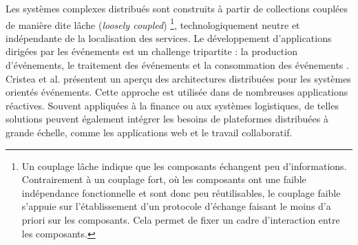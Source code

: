 Les systèmes complexes distribués sont construits à partir de collections 
couplées de manière dite \og lâche\fg{} (\textit{loosely coupled}) \footnote{Un 
couplage lâche indique que les composants échangent peu d'informations. 
Contrairement à un couplage fort, où les composants ont une faible indépendance 
fonctionnelle et sont donc peu réutilisables, le couplage faible s'appuie 
sur l'établissement d'un protocole d'échange faisant le moins d'a priori sur les 
composants. Cela permet de fixer un cadre d'interaction entre les composants.}, 
technologiquement neutre et indépendante de la localisation des services. 
Le développement d'applications dirigées par les événements est un challenge 
tripartite : la production d'événements, le traitement des événements et la 
consommation des événements \cite{Chandy2011}.
Cristea et al. \cite{Cristea2011} présentent un aperçu des architectures distribuées 
pour les systèmes orientés événements. 
Cette approche est utilisée dans de nombreuses applications réactives. Souvent 
appliquées à la finance ou aux systèmes logistiques, de telles solutions peuvent 
également intégrer les besoins de plateformes distribuées à grande échelle, 
comme les applications web et le travail collaboratif. 



